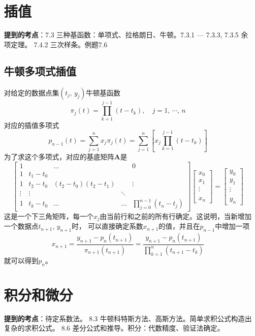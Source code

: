 \documentclass[14pt, letterpaper, UTF8, fontset=windowsnew, heading=true]{article}
\begin{document}
\section{插值}

\textbf{提到的考点}：7.3 三种基函数：单项式、拉格朗日、牛顿。7.3.1 --- 7.3.3, 7.3.5 余项定理。
7.4.2 三次样条。例题7.6

\subsection{牛顿多项式插值}
对给定的数据点集$(t_j,\,y_j)$牛顿基函数
$$\pi_j(t)=\prod_{k=1}^{j-1}(t-t_k), \quad j=1,\,\cdots,\,n$$
对应的插值多项式
$$p_{n-1}(t)=\sum_{j=1}^{n}x_j\pi_j(t)=\sum_{j=1}^{n}\left[x_j\prod_{k=1}^{j-1}(t-t_k)\right]$$
为了求这个多项式，对应的基底矩阵$\bm{A}$是
$$\begin{bmatrix}
1&&\ldots &&0\\
1&t_{1}-t_{0}&&&\\
1&t_{2}-t_{0}&(t_{2}-t_{0})(t_{2}-t_{1})&&\vdots \\
\vdots &\vdots &&\ddots &\\
1&t_{k}-t_{0}&\ldots &\ldots &\prod_{{j=0}}^{{n-1}}(t_{n}-t_{j})
\end{bmatrix}
\begin{bmatrix}x_{0}\\ x_{1} \\ \vdots \\ \\ x_{n}
\end{bmatrix}
=
\begin{bmatrix}y_{0}\\ y_{1} \\ \vdots \\ \\ y_{n}
\end{bmatrix}$$
这是一个下三角矩阵，每一个$x_j$由当前行和之前的所有行确定。这说明，当新增加一个数据点$t_{n+1},\,y_{n+1}$时，
可以直接确定系数$x_{n+1}$的值，并且在$p_{n-1}$中增加一项
$$x_{n+1}=\frac{y_{n+1}-p_n(t_{n+1})}{\pi_{n+1}(t_{n+1})}=\frac{y_{n+1}-p_n(t_{n+1})}{\prod_{k=1}^{n}(t_{n+1}-t_k)}$$
就可以得到$p_{n}$。

\section{积分和微分}

\textbf{提到的考点}：待定系数法。 8.3 牛顿科特斯方法、高斯方法。简单求积公式构造出复杂的求积公式。
8.6 差分公式和推导。积分：代数精度、验证法确定。
	
\end{document}

